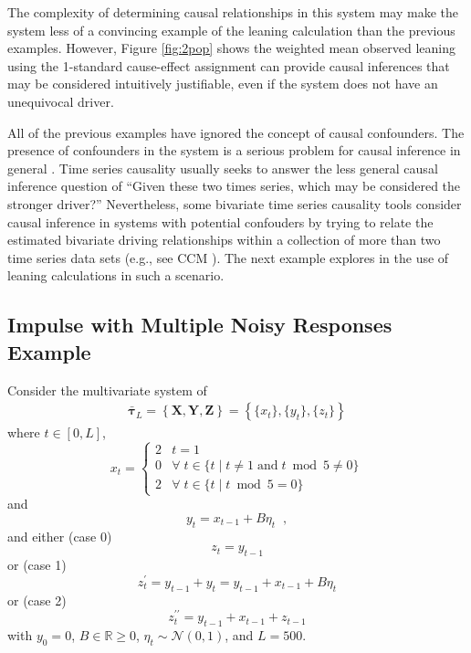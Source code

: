 \documentclass[a4paper,11pt,twocolumn]{article}
\begin{document}
The complexity of determining causal relationships in this system may make the system less of a convincing example of the leaning calculation than the previous examples.  However, Figure \ref{fig:2pop} shows the weighted mean observed leaning using the 1-standard cause-effect assignment can provide causal inferences that may be considered intuitively justifiable, even if the system does not have an unequivocal driver. 

All of the previous examples have ignored the concept of causal confounders.  The presence of confounders in the system is a serious problem for causal inference in general \cite{Rubin2015,Pearl2000}.  Time series causality usually seeks to answer the less general causal inference question of ``Given these two times series, which may be considered the stronger driver?'' Nevertheless, some bivariate time series causality tools consider causal inference in systems with potential confouders by trying to relate the estimated bivariate driving relationships within a collection of more than two time series data sets (e.g., see CCM \cite{Sugihara2012}).  The next example explores in the use of leaning calculations in such a scenario.

\subsection{Impulse with Multiple Noisy Responses Example}
Consider the multivariate system of
\begin{eqnarray}
\label{eqn:3var}
\bar{\mathbf{\tau}}_L = \left\{\mathbf{X},\mathbf{Y},\mathbf{Z}\right\} = \left\{\{x_t\},\{y_t\},\{z_t\}\right\}
\end{eqnarray}
where $t\in[0,L]$,
\begin{equation*}
x_t = \left\{
  \begin{array}{lr}
    2 & t = 1\\
    0 & \forall\; t\in\{t\;|\;t\neq 1 \;\mathrm{and}\; t\bmod 5 \neq 0\}\\
    2 & \forall\; t\in\{t\;|\;t\bmod 5 = 0\}
  \end{array}
\right.
\end{equation*}
and
\begin{equation*}
y_t = x_{t-1} + B\eta_t\;\;,
\end{equation*}
and either (case 0)
\begin{equation}
z_t = y_{t-1}
\end{equation}
or (case 1)
\begin{equation}
z_t^\prime = y_{t-1} + y_t = y_{t-1} + x_{t-1} + B\eta_t
\end{equation}
or (case 2)
\begin{equation}
z_t^{\prime\prime} = y_{t-1} + x_{t-1} + z_{t-1}
\end{equation}
with $y_0 = 0$, $B\in\mathbb{R}\ge 0$, $\eta_t\sim\mathcal{N}\left(0,1\right)$, and $L=500$.
\end{document}
